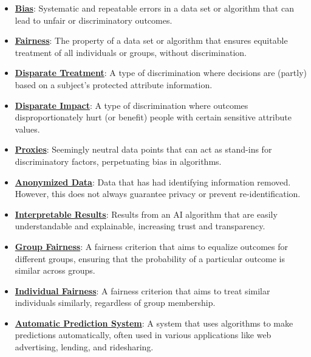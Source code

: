 \documentclass{article}%
\begin{document}
\begin{itemize}[leftmargin=*]%
\item \href{https://www.math.purdue.edu/~yipn/351/16L2-ethics.pdf#page=2}{\textbf{Bias}}: Systematic and repeatable errors in a data set or algorithm that can lead to unfair or discriminatory outcomes.%
\item \href{https://www.math.purdue.edu/~yipn/351/16L2-ethics.pdf#page=2}{\textbf{Fairness}}: The property of a data set or algorithm that ensures equitable treatment of all individuals or groups, without discrimination.%
\item \href{https://www.math.purdue.edu/~yipn/351/16L2-ethics.pdf#page=19}{\textbf{Disparate Treatment}}: A type of discrimination where decisions are (partly) based on a subject's protected attribute information.%
\item \href{https://www.math.purdue.edu/~yipn/351/16L2-ethics.pdf#page=19}{\textbf{Disparate Impact}}: A type of discrimination where outcomes disproportionately hurt (or benefit) people with certain sensitive attribute values.%
\item \href{https://www.math.purdue.edu/~yipn/351/16L2-ethics.pdf#page=13}{\textbf{Proxies}}: Seemingly neutral data points that can act as stand-ins for discriminatory factors, perpetuating bias in algorithms.%
\item \href{https://www.math.purdue.edu/~yipn/351/16L2-ethics.pdf#page=10}{\textbf{Anonymized Data}}: Data that has had identifying information removed. However, this does not always guarantee privacy or prevent re-identification.%
\item \href{https://www.math.purdue.edu/~yipn/351/16L2-ethics.pdf#page=28}{\textbf{Interpretable Results}}: Results from an AI algorithm that are easily understandable and explainable, increasing trust and transparency.%
\item \href{https://www.math.purdue.edu/~yipn/351/16L2-ethics.pdf#page=26}{\textbf{Group Fairness}}: A fairness criterion that aims to equalize outcomes for different groups, ensuring that the probability of a particular outcome is similar across groups.%
\item \href{https://www.math.purdue.edu/~yipn/351/16L2-ethics.pdf#page=27}{\textbf{Individual Fairness}}: A fairness criterion that aims to treat similar individuals similarly, regardless of group membership.%
\item \href{https://www.math.purdue.edu/~yipn/351/16L2-ethics.pdf#page=4}{\textbf{Automatic Prediction System}}: A system that uses algorithms to make predictions automatically, often used in various applications like web advertising, lending, and ridesharing.%
\end{itemize}
\end{document}
